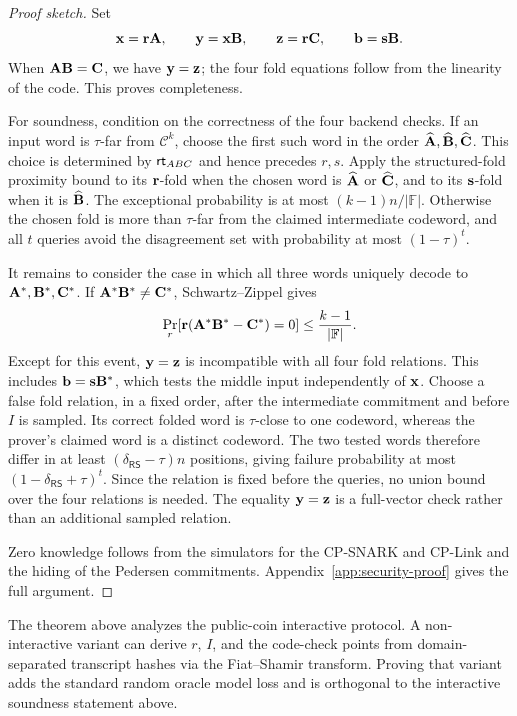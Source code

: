 \begin{revblock}
\begin{proof}[Proof sketch]
Set
\[
  \mathbf x=\mathbf r\mathbf A,\qquad
  \mathbf y=\mathbf x\mathbf B,\qquad
  \mathbf z=\mathbf r\mathbf C,\qquad
  \mathbf b=\mathbf s\mathbf B.
\]
When \(\mathbf A\mathbf B=\mathbf C\), we have \(\mathbf y=\mathbf z\); the four fold
equations follow from the linearity of the code.  This proves completeness.

For soundness, condition on the correctness of the four backend checks.  If an
input word is \(\tau\)-far from \(\mathcal C^k\), choose the first such word in
the order \(\widehat{\mathbf A},\widehat{\mathbf B},\widehat{\mathbf C}\).  This choice
is determined by \(\textsf{rt}_{ABC}\) and hence precedes \(r,s\).  Apply the
structured-fold proximity bound to its \(\mathbf r\)-fold when the chosen word is
\(\widehat{\mathbf A}\) or \(\widehat{\mathbf C}\), and to its \(\mathbf s\)-fold when
it is \(\widehat{\mathbf B}\).  The exceptional probability is at most
\((k-1)n/|\mathbb F|\).  Otherwise the chosen fold is more than \(\tau\)-far
from the claimed intermediate codeword, and all \(t\) queries avoid the
disagreement set with probability at most \((1-\tau)^t\).

It remains to consider the case in which all three words uniquely decode to
\(\mathbf A^*,\mathbf B^*,\mathbf C^*\).  If
\(\mathbf A^*\mathbf B^*\ne\mathbf C^*\), Schwartz--Zippel gives
\[
 \Pr_r[\mathbf r(\mathbf A^*\mathbf B^*-\mathbf C^*)=0]
 \le\frac{k-1}{|\mathbb F|}.
\]
Except for this event, \(\mathbf y=\mathbf z\) is incompatible with all four fold
relations.  This includes \(\mathbf b=\mathbf s\mathbf B^*\), which tests the middle
input independently of \(\mathbf x\).  Choose a false fold relation, in a fixed
order, after the intermediate commitment and before \(I\) is sampled.  Its
correct folded word is \(\tau\)-close to one codeword, whereas the prover's
claimed word is a distinct codeword.  The two tested words therefore differ
in at least \((\delta_{\mathsf{RS}}-\tau)n\) positions, giving failure
probability at most \((1-\delta_{\mathsf{RS}}+\tau)^t\).  Since the relation is
fixed before the queries, no union bound over the four relations is needed.
The equality \(\mathbf y=\mathbf z\) is a full-vector check rather than an
additional sampled relation.

Zero knowledge follows from the simulators for the CP-SNARK and CP-Link and the
hiding of the Pedersen commitments.  Appendix~\ref{app:security-proof} gives
the full argument.
\end{proof}

\begin{remark}
The theorem above analyzes the public-coin interactive protocol.  A
non-interactive variant can derive \(r\), \(I\), and the code-check points from
domain-separated transcript hashes via the Fiat--Shamir transform.  Proving
that variant adds the standard random oracle model loss and is orthogonal to
the interactive soundness statement above.
\end{remark}
\end{revblock}

